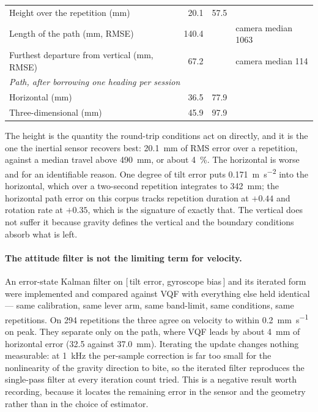 \begin{table}[t]
\begin{tabular}{lrrrr}
    Height over the repetition (\si{\milli\metre})           & 20.1 & 57.5 & & \\
    Length of the path (\si{\milli\metre}, RMSE)             & 140.4 & & \multicolumn{2}{l}{\footnotesize camera median 1063} \\
    Furthest departure from vertical (\si{\milli\metre}, RMSE) & 67.2 & & \multicolumn{2}{l}{\footnotesize camera median 114} \\
    \midrule
    \multicolumn{5}{l}{\emph{Path, after borrowing one heading per session}} \\
    Horizontal (\si{\milli\metre})                           & 36.5 & 77.9 & & \\
    Three-dimensional (\si{\milli\metre})                    & 45.9 & 97.9 & & \\
    \bottomrule
  \end{tabular}
\end{table}

The height is the quantity the round-trip conditions act on directly, and it is the one
the inertial sensor recovers best: \SI{20.1}{\milli\metre} of RMS error over a repetition,
against a median travel above \SI{490}{\milli\metre}, or about \SI{4}{\percent}. The
horizontal is worse and for an identifiable reason. One degree of tilt error puts
\SI{0.171}{\metre\per\second\squared} into the horizontal, which over a two-second
repetition integrates to \SI{342}{\milli\metre}; the horizontal path error on this corpus
tracks repetition duration at $+0.44$ and rotation rate at $+0.35$, which is the signature
of exactly that. The vertical does not suffer it because gravity defines the vertical and
the boundary conditions absorb what is left.

\paragraph{The attitude filter is not the limiting term for velocity.} An error-state
Kalman filter on $[\,$tilt error, gyroscope bias$\,]$ and its iterated form were
implemented and compared against VQF with everything else held identical --- same
calibration, same lever arm, same band-limit, same conditions, same repetitions. On
\num{294} repetitions the three agree on velocity to within
\SI{0.2}{\milli\metre\per\second} on peak. They separate only on the path, where VQF leads
by about \SI{4}{\milli\metre} of horizontal error (\num{32.5} against
\SI{37.0}{\milli\metre}). Iterating the update changes nothing measurable: at
\SI{1}{\kilo\hertz} the per-sample correction is far too small for the nonlinearity of the
gravity direction to bite, so the iterated filter reproduces the single-pass filter at
every iteration count tried. This is a negative result worth recording, because it locates
the remaining error in the sensor and the geometry rather than in the choice of estimator.


